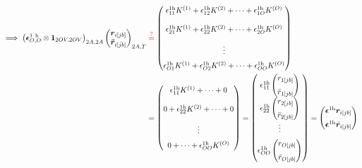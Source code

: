 \begin{align}
    \implies \left(\bm{\epsilon}^{1 \mathrm{~h}}_{O,O} \otimes \bm{1}_{2OV,2OV} \right)_{2A,2A}\begin{pmatrix}
    \bm{r}_{i[jb]} \\
\bm{\bar{r}}_{i[\bar{jb}]}
\end{pmatrix}_{2A,T}
& \color{red} \stackrel{?}{=} \color{black} \begin{pmatrix}
\epsilon^{1\mathrm{h}}_{11} K^{(1)} + \epsilon^{1\mathrm{h}}_{12} K^{(2)} + \dots + \epsilon^{1\mathrm{h}}_{1O} K^{(O)} \\[1.2em]
\epsilon^{1\mathrm{h}}_{21} K^{(1)} + \epsilon^{1\mathrm{h}}_{22} K^{(2)} + \dots + \epsilon^{1\mathrm{h}}_{2O} K^{(O)} \\[1em]
\vdots \\[6pt]
\epsilon^{1\mathrm{h}}_{O1} K^{(1)} + \epsilon^{1\mathrm{h}}_{O2} K^{(2)} + \dots + \epsilon^{1\mathrm{h}}_{OO} K^{(O)}
\end{pmatrix}\\
& =\begin{pmatrix}
\epsilon^{1\mathrm{h}}_{11} K^{(1)} + \dots +0 \\[1.2em]
0 + \epsilon^{1\mathrm{h}}_{22} K^{(2)} + \dots + 0 \\[1em]
\vdots \\[6pt]
0 + \dots + \epsilon^{1\mathrm{h}}_{OO} K^{(O)}
\end{pmatrix} =\begin{pmatrix}
\epsilon^{1\mathrm{h}}_{11} \begin{pmatrix} r_{1[jb]} \\[6pt]
\bar{r}_{1[{j} b]} \end{pmatrix}\\
\epsilon^{1\mathrm{h}}_{22} \begin{pmatrix} r_{2[jb]} \\[6pt]
\bar{r}_{2[{j} b]} \end{pmatrix}\\
\vdots \\[6pt]
\epsilon^{1\mathrm{h}}_{OO} \begin{pmatrix} r_{O[jb]} \\[6pt]
\bar{r}_{O[{j} b]} \end{pmatrix}
\end{pmatrix} = \begin{pmatrix}
\bm{\epsilon}^{1\mathrm{h}} \bm{r}_{i[jb]} \\[6pt]
\bm{\epsilon}^{1\mathrm{h}} \bar{\bm{r}}_{i[{jb}]}
\end{pmatrix}
\end{align}
